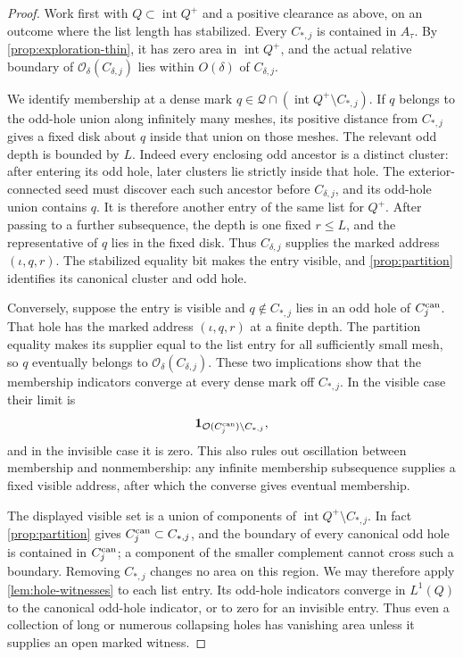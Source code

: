 \begin{proof}
Work first with \(Q\subset\operatorname{int}Q^+\) and a positive
clearance as above, on an outcome where the list length has stabilized.
Every \(C_{*,j}\) is contained in \(A_\tau\). By
\cref{prop:exploration-thin}, it has zero area in
\(\operatorname{int}Q^+\), and the actual relative boundary of
\(\mathcal O_\delta(C_{\delta,j})\) lies within \(O(\delta)\) of
\(C_{\delta,j}\).

We identify membership at a dense mark \(q\in\mathcal Q\cap
(\operatorname{int}Q^+\setminus C_{*,j})\). If \(q\) belongs to the
odd-hole union along infinitely many meshes, its positive distance
from \(C_{*,j}\) gives a fixed disk about \(q\) inside that union
on those meshes. The relevant odd depth is bounded by \(L\).
Indeed every enclosing odd ancestor is a distinct cluster: after
entering its odd hole, later clusters lie strictly inside that hole.
The exterior-connected seed must discover each such ancestor before
\(C_{\delta,j}\), and its odd-hole union contains \(q\). It is
therefore another entry of the same list for \(Q^+\).
After passing to a further subsequence, the depth is one fixed
\(r\leq L\), and the representative of \(q\) lies in the fixed disk.
Thus \(C_{\delta,j}\) supplies the marked address
\((\iota,q,r)\). The stabilized equality bit makes the entry visible,
and \cref{prop:partition} identifies its canonical cluster and odd
hole.

Conversely, suppose the entry is visible and \(q\notin C_{*,j}\)
lies in an odd hole of \(C_j^{\rm can}\). That hole has the marked
address \((\iota,q,r)\) at a finite depth. The partition equality
makes its supplier equal to the list entry for all sufficiently
small mesh, so \(q\) eventually belongs to
\(\mathcal O_\delta(C_{\delta,j})\). These two implications show
that the membership indicators converge at every dense mark off
\(C_{*,j}\). In the visible case their limit is
\[
 \mathbf 1_{\mathcal O(C_j^{\rm can})\setminus C_{*,j}},
\]
and in the invisible case it is zero. This also rules out
oscillation between membership and nonmembership: any infinite
membership subsequence supplies a fixed visible address, after
which the converse gives eventual membership.

The displayed visible set is a union of components of
\(\operatorname{int}Q^+\setminus C_{*,j}\). In fact
\cref{prop:partition} gives \(C_j^{\rm can}\subset C_{*,j}\), and
the boundary of every canonical odd hole is contained in
\(C_j^{\rm can}\); a component of the smaller complement cannot
cross such a boundary. Removing \(C_{*,j}\) changes no area on this
region. We may therefore apply \cref{lem:hole-witnesses} to each
list entry. Its odd-hole indicators converge in \(L^1(Q)\) to the
canonical odd-hole indicator, or to zero for an invisible entry.
Thus even a collection of long or numerous collapsing holes has
vanishing area unless it supplies an open marked witness.


\end{proof}
